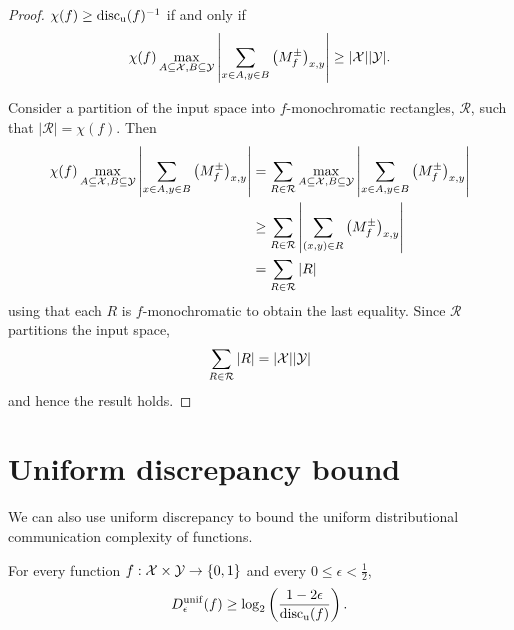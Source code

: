 \begin{proof}
$\chi(f) \geq \mathrm{disc_u}(f)^{-1}$ if and only if
$$\chi(f)\max_{A \subseteq \mathcal{X}, B \subseteq \mathcal{Y}}\left| \sum_{x \in A, y \in B} \big(M^{\pm}_f\big)_{x,y} \right| \geq |\mathcal{X}||\mathcal{Y}|.$$

Consider a partition of the input space into $f$-monochromatic rectangles, $\mathcal R$, such that $|\mathcal R| = \chi(f)$. Then
\begin{align*}\chi(f)\max_{A \subseteq \mathcal{X}, B \subseteq \mathcal{Y}}\left| \sum_{x \in A, y \in B} \big(M^{\pm}_f\big)_{x,y} \right|  &= \sum_{R\in \mathcal R} \max_{A \subseteq \mathcal{X}, B \subseteq \mathcal{Y}}\left| \sum_{x \in A, y \in B} \big(M^{\pm}_f\big)_{x,y} \right|\\
&\geq\sum_{R \in \mathcal{R}} \left| \sum_{(x,y) \in R} \big(M^{\pm}_f\big)_{x,y} \right|\\
&= \sum_{R \in \mathcal R} |R|
\end{align*}
using that each $R$ is $f$-monochromatic to obtain the last equality. Since $\mathcal R$ partitions the input space,
$$\sum_{R \in \mathcal R} |R| = |\mathcal{X}||\mathcal{Y}|$$
and hence the result holds.
\end{proof}


\newpage \section{Uniform discrepancy bound}

We can also use uniform discrepancy to bound the uniform distributional  communication complexity of functions.

\begin{lemma}
For every function $f : \mathcal{X} \times \mathcal{Y} \to \{0,1\}$ and every $0 \le \epsilon < \frac12$, 
\[
D_\epsilon^{\mathrm{unif}}(f) \ge \log_2 \left( \frac{1-2\epsilon}{\mathrm{disc_u}(f)} \right).
\]
\end{lemma}

